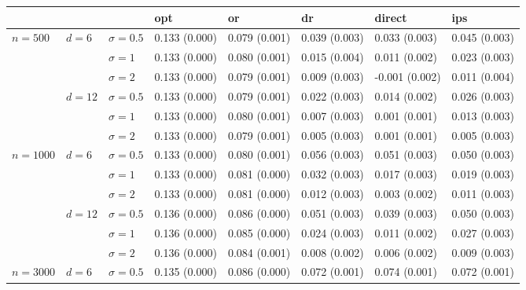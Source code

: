 \documentclass[11pt]{article} %
\theoremstyle{theorem}  %
\theoremstyle{plain}
\begin{document}
\begin{figure}[H]
\scriptsize
\centering
\begin{tabular}{llllllll}
\toprule
         &        &            &            opt &             or &             dr &          direct &            ips \\
\midrule
\multirow{6}{*}{$n=500$} & \multirow{3}{*}{$d=6$} & $\sigma=0.5$ &  0.133 (0.000) &  0.079 (0.001) &  0.039 (0.003) &   0.033 (0.003) &  0.045 (0.003) \\
         &        & $\sigma=1$ &  0.133 (0.000) &  0.080 (0.001) &  0.015 (0.004) &   0.011 (0.002) &  0.023 (0.003) \\
         &        & $\sigma=2$ &  0.133 (0.000) &  0.079 (0.001) &  0.009 (0.003) &  -0.001 (0.002) &  0.011 (0.004) \\
\cline{2-8}
         & \multirow{3}{*}{$d=12$} & $\sigma=0.5$ &  0.133 (0.000) &  0.079 (0.001) &  0.022 (0.003) &   0.014 (0.002) &  0.026 (0.003) \\
         &        & $\sigma=1$ &  0.133 (0.000) &  0.080 (0.001) &  0.007 (0.003) &   0.001 (0.001) &  0.013 (0.003) \\
         &        & $\sigma=2$ &  0.133 (0.000) &  0.079 (0.001) &  0.005 (0.003) &   0.001 (0.001) &  0.005 (0.003) \\
\cline{1-8}
\cline{2-8}
\multirow{6}{*}{$n=1000$} & \multirow{3}{*}{$d=6$} & $\sigma=0.5$ &  0.133 (0.000) &  0.080 (0.001) &  0.056 (0.003) &   0.051 (0.003) &  0.050 (0.003) \\
         &        & $\sigma=1$ &  0.133 (0.000) &  0.081 (0.000) &  0.032 (0.003) &   0.017 (0.003) &  0.019 (0.003) \\
         &        & $\sigma=2$ &  0.133 (0.000) &  0.081 (0.000) &  0.012 (0.003) &   0.003 (0.002) &  0.011 (0.003) \\
\cline{2-8}
         & \multirow{3}{*}{$d=12$} & $\sigma=0.5$ &  0.136 (0.000) &  0.086 (0.000) &  0.051 (0.003) &   0.039 (0.003) &  0.050 (0.003) \\
         &        & $\sigma=1$ &  0.136 (0.000) &  0.085 (0.000) &  0.024 (0.003) &   0.011 (0.002) &  0.027 (0.003) \\
         &        & $\sigma=2$ &  0.136 (0.000) &  0.084 (0.001) &  0.008 (0.002) &   0.006 (0.002) &  0.009 (0.003) \\
\cline{1-8}
\cline{2-8}
\multirow{6}{*}{$n=3000$} & \multirow{3}{*}{$d=6$} & $\sigma=0.5$ &  0.135 (0.000) &  0.086 (0.000) &  0.072 (0.001) &   0.074 (0.001) &  0.072 (0.001) \\

\end{tabular}
\end{figure}
\end{document}
